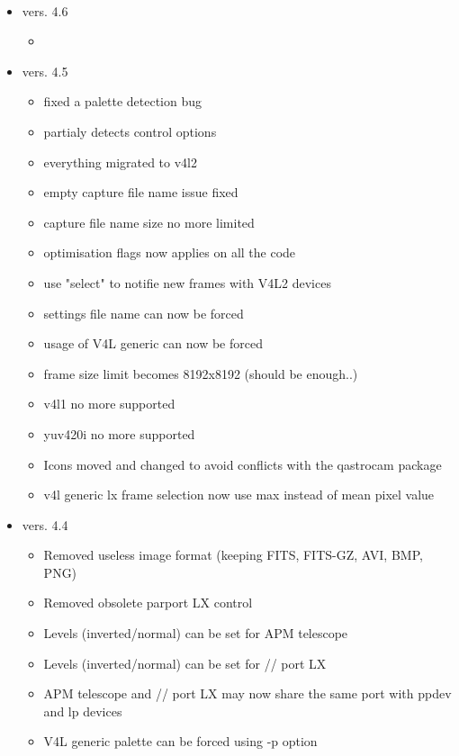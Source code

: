 \documentclass[11pt,a4paper]{book}
\begin{document}
\paragraph*{}
\renewcommand\labelitemi{\textbullet}
\begin{itemize}
\item vers. 4.6
\begin{itemize}
\item
\end{itemize}
\item vers. 4.5
\begin{itemize}
\item fixed a palette detection bug
\item partialy detects control options
\item everything migrated to v4l2
\item empty capture file name issue fixed
\item capture file name size no more limited
\item optimisation flags now applies on all the code
\item use "select" to notifie new frames with V4L2 devices
\item settings file name can now be forced
\item usage of V4L generic can now be forced
\item frame size limit becomes 8192x8192 (should be enough..)
\item v4l1 no more supported
\item yuv420i no more supported
\item Icons moved and changed to avoid conflicts with the qastrocam package
\item v4l generic lx frame selection now use max instead of mean pixel value
\end{itemize}
\item vers. 4.4
\begin{itemize}
\item Removed useless image format (keeping FITS, FITS-GZ, AVI, BMP, PNG)
\item Removed obsolete parport LX control
\item Levels (inverted/normal) can be set for APM telescope
\item Levels (inverted/normal) can be set for // port LX
\item APM telescope and // port LX may now share the same port with ppdev and lp devices
\item V4L generic palette can be forced using -p option

\end{itemize}
\end{itemize}
\end{document}
